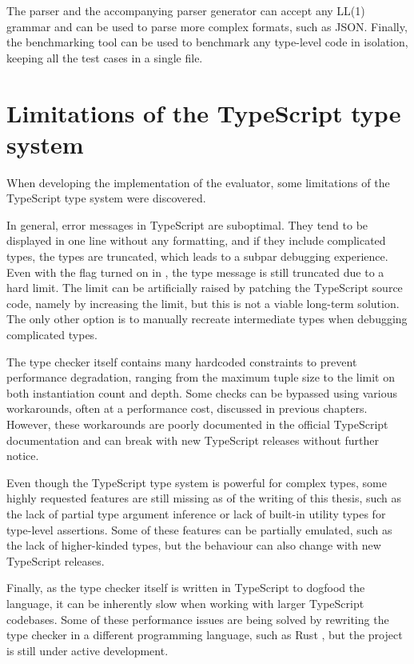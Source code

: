 The parser and the accompanying parser generator can accept any LL(1) grammar and can be used to parse more complex formats, such as JSON. Finally, the benchmarking tool can be used to benchmark any type-level code in isolation, keeping all the test cases in a single file.

\section{Limitations of the TypeScript type system}

When developing the implementation of the evaluator, some limitations of the TypeScript type system were discovered.

In general, error messages in TypeScript are suboptimal. They tend to be displayed in one line without any formatting, and if they include complicated types, the types are truncated, which leads to a subpar debugging experience. Even with the  flag turned on in , the type message is still truncated due to a hard limit. The limit can be artificially raised by patching the TypeScript source code, namely by increasing the  limit, but this is not a viable long-term solution. The only other option is to manually recreate intermediate types when debugging complicated types.

The type checker itself contains many hardcoded constraints to prevent performance degradation, ranging from the maximum tuple size to the limit on both instantiation count and depth. Some checks can be bypassed using various workarounds, often at a performance cost, discussed in previous chapters. However, these workarounds are poorly documented in the official TypeScript documentation and can break with new TypeScript releases without further notice.

Even though the TypeScript type system is powerful for complex types, some highly requested features are still missing as of the writing of this thesis, such as the lack of partial type argument inference \cite{ImplementPartialType} or lack of built-in utility types for type-level assertions. Some of these features can be partially emulated, such as the lack of higher-kinded types, but the behaviour can also change with new TypeScript releases.

Finally, as the type checker itself is written in TypeScript to dogfood the language, it can be inherently slow when working with larger TypeScript codebases. Some of these performance issues are being solved by rewriting the type checker in a different programming language, such as Rust \cite{Stc2023}, but the project is still under active development.

